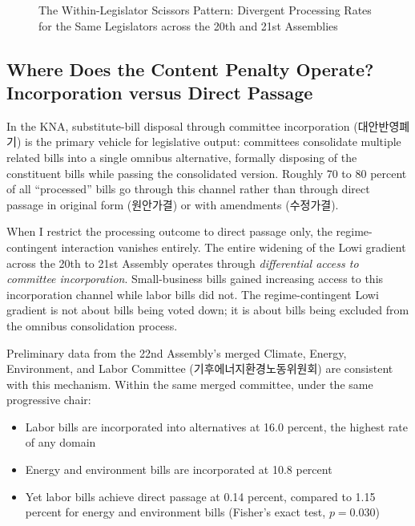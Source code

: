 \documentclass[11pt]{article}
\begin{document}
\begin{figure}[H]
\centering
{}
\caption{The Within-Legislator Scissors Pattern: Divergent Processing Rates for the Same Legislators across the 20th and 21st Assemblies}
\label{fig:scissors}
\end{figure}

\subsection{Where Does the Content Penalty Operate? Incorporation versus Direct Passage}
\label{sec:results-mechanism}

In the KNA, substitute-bill disposal through committee incorporation (대안반영폐기) is the primary vehicle for legislative output: committees consolidate multiple related bills into a single omnibus alternative, formally disposing of the constituent bills while passing the consolidated version. Roughly 70 to 80 percent of all ``processed'' bills go through this channel rather than through direct passage in original form (원안가결) or with amendments (수정가결).

When I restrict the processing outcome to direct passage only, the regime-contingent interaction vanishes entirely. The entire widening of the Lowi gradient across the 20th to 21st Assembly operates through \emph{differential access to committee incorporation}. Small-business bills gained increasing access to this incorporation channel while labor bills did not. The regime-contingent Lowi gradient is not about bills being voted down; it is about bills being excluded from the omnibus consolidation process.

Preliminary data from the 22nd Assembly's merged Climate, Energy, Environment, and Labor Committee (기후에너지환경노동위원회) are consistent with this mechanism. Within the same merged committee, under the same progressive chair:

\begin{itemize}
\item Labor bills are incorporated into alternatives at 16.0 percent, the highest rate of any domain
\item Energy and environment bills are incorporated at 10.8 percent
\item Yet labor bills achieve direct passage at 0.14 percent, compared to 1.15 percent for energy and environment bills (Fisher's exact test, $p = 0.030$)
\end{itemize}
\end{document}
